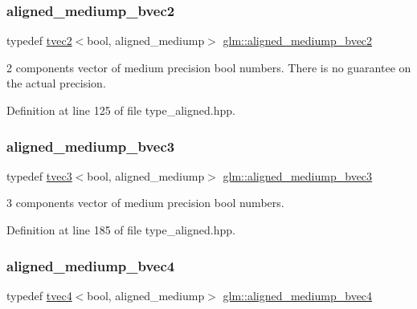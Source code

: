 \subsubsection{\texorpdfstring{aligned\_mediump\_bvec2}{aligned\_mediump\_bvec2}}
{\footnotesize\ttfamily typedef \mbox{\hyperlink{structglm_1_1tvec2}{tvec2}}$<$bool, aligned\+\_\+mediump$>$ \mbox{\hyperlink{group__gtc__type__aligned_ga6a8eda49fb7f05dc574be67d8988822b}{glm\+::aligned\+\_\+mediump\+\_\+bvec2}}}

2 components vector of medium precision bool numbers. There is no guarantee on the actual precision. 

Definition at line 125 of file type\+\_\+aligned.\+hpp.

\mbox{\label{group__gtc__type__aligned_gaf2b80c6765cdb6cd9c4458ad5f0e66a2}} 
\subsubsection{\texorpdfstring{aligned\_mediump\_bvec3}{aligned\_mediump\_bvec3}}
{\footnotesize\ttfamily typedef \mbox{\hyperlink{structglm_1_1tvec3}{tvec3}}$<$bool, aligned\+\_\+mediump$>$ \mbox{\hyperlink{group__gtc__type__aligned_gaf2b80c6765cdb6cd9c4458ad5f0e66a2}{glm\+::aligned\+\_\+mediump\+\_\+bvec3}}}



3 components vector of medium precision bool numbers. 



Definition at line 185 of file type\+\_\+aligned.\+hpp.

\mbox{\label{group__gtc__type__aligned_ga2125d53e043f27687b7a40d14bd05ca0}} 
\subsubsection{\texorpdfstring{aligned\_mediump\_bvec4}{aligned\_mediump\_bvec4}}
{\footnotesize\ttfamily typedef \mbox{\hyperlink{structglm_1_1tvec4}{tvec4}}$<$bool, aligned\+\_\+mediump$>$ \mbox{\hyperlink{group__gtc__type__aligned_ga2125d53e043f27687b7a40d14bd05ca0}{glm\+::aligned\+\_\+mediump\+\_\+bvec4}}}



